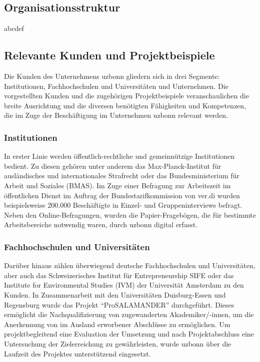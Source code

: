 \subsection{Organisationsstruktur}
abcdef

\subsection{Relevante Kunden und Projektbeispiele }
Die Kunden des Unternehmens uzbonn gliedern sich in drei Segmente: Institutionen, Fachhochschulen und Universitäten und Unternehmen. Die vorgestellten Kunden und die zugehörigen Projektbeispiele veranschaulichen die breite Ausrichtung und die diversen benötigten Fähigkeiten und Kompetenzen, die im Zuge der Beschäftigung im Unternehmen uzbonn relevant werden. \\

\subsubsection{Institutionen }
In erster Linie werden öffentlich-rechtliche und gemeinnützige Institutionen bedient. Zu diesen gehören unter anderem das Max-Planck-Institut für ausländisches und internationales Strafrecht oder das Bundesministerium für Arbeit und Soziales (BMAS). Im Zuge einer Befragung zur Arbeitszeit im öffentlichen Dienst im Auftrag der Bundestarifkommission von ver.di wurden beispielsweise 200.000 Beschäftigte in Einzel- und Gruppeninterviews befragt. Neben den Online-Befragungen, wurden die Papier-Fragebögen, die für bestimmte Arbeitsbereiche notwendig waren, durch uzbonn digital erfasst.\\

\subsubsection{Fachhochschulen und Universitäten }
Darüber hinaus zählen überwiegend deutsche Fachhochschulen und Universitäten, aber auch das Schweizerisches Institut für Entrepreneurship SIFE oder das Institute for Environmental Studies (IVM) der Universität Amsterdam zu den Kunden. In Zusammenarbeit mit den Universitäten Duisburg-Essen und Regensburg wurde das Projekt “ProSALAMANDER” durchgeführt. Dieses ermöglicht die Nachqualifizierung von zugewanderten Akademiker/-innen, um die Anerkennung von im Ausland erworbener Abschlüsse zu ermöglichen. Um projektbegleitend eine Evaluation der Umsetzung und nach Projektabschluss eine Untersuchung der Zielerreichung zu gewährleisten, wurde uzbonn über die Laufzeit des Projektes unterstützend eingesetzt. \\

